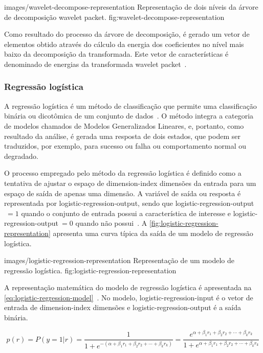   {images/wavelet-decompose-representation}
  {Representação de dois níveis da árvore de decomposição wavelet packet.}
  {fig:wavelet-decompose-representation}

Como resultado do processo da árvore de decomposição, é gerado um vetor de elementos obtido através
do cálculo da energia dos coeficientes no nível mais baixo da decomposição da transformada. Este
vetor de características é denominado de energias da transformada wavelet
packet~\cite{ims2007documentation}.


\subsubsection{Regressão logística}

A regressão logística é um método de classificação que permite uma classificação binária ou
dicotômica de um conjunto de dados~\cite{hosmer2013applied}. O método integra a categoria de modelos
chamados de Modelos Generalizados Lineares, e, portanto, como resultado da análise, é gerada uma
resposta de dois estados, que podem ser traduzidos, por exemplo, para sucesso ou falha ou
comportamento normal ou degradado.

O processo empregado pelo método da regressão logística é definido como a tentativa de ajustar o
espaço de \gls{dimension-index} dimensões da entrada para um espaço de saída de apenas uma dimensão.
A variável de saída ou resposta é representada por \gls{logistic-regression-output}, sendo que
\gls{logistic-regression-output}{\ensuremath{~= 1}} quando o conjunto de entrada possui a
característica de interesse e \gls{logistic-regression-output}{\ensuremath{~= 0}} quando não
possui~\cite{hosmer2013applied}. A \cref{fig:logistic-regression-representation} apresenta uma
curva típica da saída de um modelo de regressão logística.

  {images/logistic-regression-representation}
  {Representação de um modelo de regressão logística.}
  {fig:logistic-regression-representation}

A representação matemática do modelo de regressão logística é apresentada na
\cref{eq:logistic-regression-model}~\cite{ims2007documentation}. No modelo,
\gls{logistic-regression-input} é o vetor de entrada de \gls{dimension-index} dimensões e
\gls{logistic-regression-output} é a saída binária.

\begin{equation}
  p(r) =
  P(y = 1 | r) =
  \frac{1}{1 + e^{- \left (
    \alpha + \beta_{1} r_{1} + \beta_{2} r_{2} + \cdots + \beta_{k} r_{k} \right )}} =
  \frac{e^{\alpha + \beta_{1} r_{1} + \beta_{2} r_{2} + \cdots + \beta_{k} r_{k}}}
    {1 + e^{\alpha + \beta_{1} r_{1} + \beta_{2} r_{2} + \cdots + \beta_{k} r_{k}}}
  \label{eq:logistic-regression-model}
\end{equation}

